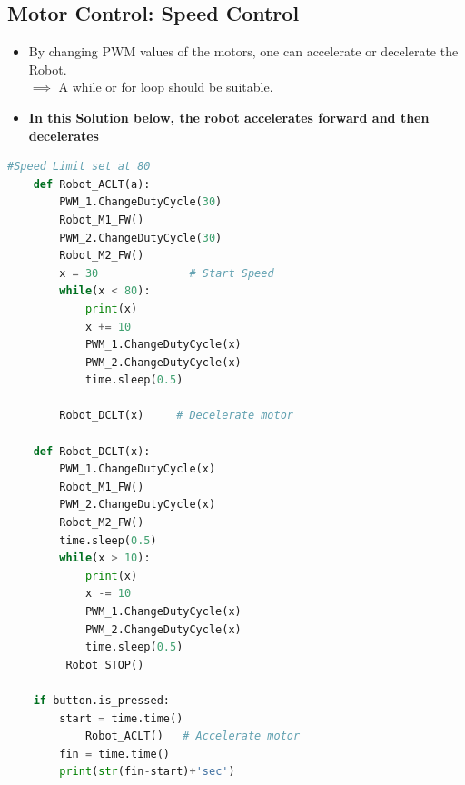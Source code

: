 \subsection*{\Large Motor Control: Speed Control }
    \begin{itemize}
        \item  By changing PWM values of the motors, one can accelerate or decelerate the Robot.\\ 
        $\implies$ A while or for loop should be suitable.
      
        \item \textbf{In this Solution  below, the robot accelerates forward and then decelerates}
        \end{itemize}

 \begin{lstlisting}[language=Python]
    #Speed Limit set at 80
    def Robot_ACLT(a):
        PWM_1.ChangeDutyCycle(30)
        Robot_M1_FW()
        PWM_2.ChangeDutyCycle(30)
        Robot_M2_FW()
        x = 30              # Start Speed
        while(x < 80):
            print(x)
            x += 10
            PWM_1.ChangeDutyCycle(x)
            PWM_2.ChangeDutyCycle(x)
            time.sleep(0.5)
        
        Robot_DCLT(x)     # Decelerate motor

    def Robot_DCLT(x):
        PWM_1.ChangeDutyCycle(x)
        Robot_M1_FW()
        PWM_2.ChangeDutyCycle(x)
        Robot_M2_FW()
        time.sleep(0.5)
        while(x > 10):
            print(x)
            x -= 10
            PWM_1.ChangeDutyCycle(x)
            PWM_2.ChangeDutyCycle(x)
            time.sleep(0.5)
         Robot_STOP()
         
    if button.is_pressed:
        start = time.time()
            Robot_ACLT()   # Accelerate motor
        fin = time.time()
        print(str(fin-start)+'sec')


   
        \end{lstlisting}

    
\newpage
